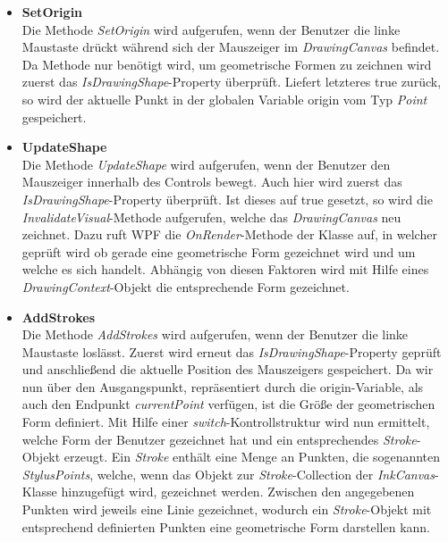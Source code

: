 \begin{itemize}
\item \textbf{SetOrigin}\\
Die Methode \textit{SetOrigin} wird aufgerufen, wenn der Benutzer die linke Maustaste drückt während sich der Mauszeiger im \textit{DrawingCanvas} befindet. Da Methode nur benötigt wird, um geometrische Formen zu zeichnen wird zuerst das \textit{IsDrawingShape}-Property überprüft. Liefert letzteres true zurück, so wird der aktuelle Punkt in der globalen Variable origin vom Typ \textit{Point} gespeichert.
\item \textbf{UpdateShape}\\
Die Methode \textit{UpdateShape} wird aufgerufen, wenn der Benutzer den Mauszeiger innerhalb des Controls bewegt. Auch hier wird zuerst das \textit{IsDrawingShape}-Property überprüft. Ist dieses auf true gesetzt, so wird die \textit{InvalidateVisual}-Methode aufgerufen, welche das \textit{DrawingCanvas} neu zeichnet. Dazu ruft WPF die \textit{OnRender}-Methode der Klasse auf, in welcher geprüft wird ob gerade eine geometrische Form gezeichnet wird und um welche es sich handelt. Abhängig von diesen Faktoren wird mit Hilfe eines \textit{DrawingContext}-Objekt die entsprechende Form gezeichnet.
\item \textbf{AddStrokes}\\
Die Methode \textit{AddStrokes} wird aufgerufen, wenn der Benutzer die linke Maustaste loslässt. Zuerst wird erneut das \textit{IsDrawingShape}-Property geprüft und anschließend die aktuelle Position des Mauszeigers gespeichert. Da wir nun über den Ausgangspunkt, repräsentiert durch die origin-Variable, als auch den Endpunkt \textit{currentPoint} verfügen, ist die Größe der geometrischen Form definiert.
Mit Hilfe einer \textit{switch}-Kontrollstruktur wird nun ermittelt, welche Form der Benutzer gezeichnet hat und ein entsprechendes \textit{Stroke}-Objekt erzeugt. Ein \textit{Stroke} enthält eine Menge an Punkten, die sogenannten \textit{StylusPoints}, welche, wenn das Objekt zur \textit{Stroke}-Collection der \textit{InkCanvas}-Klasse hinzugefügt wird, gezeichnet werden. Zwischen den angegebenen Punkten wird jeweils eine Linie gezeichnet, wodurch ein \textit{Stroke}-Objekt mit entsprechend definierten Punkten eine geometrische Form darstellen kann.
\end{itemize}

